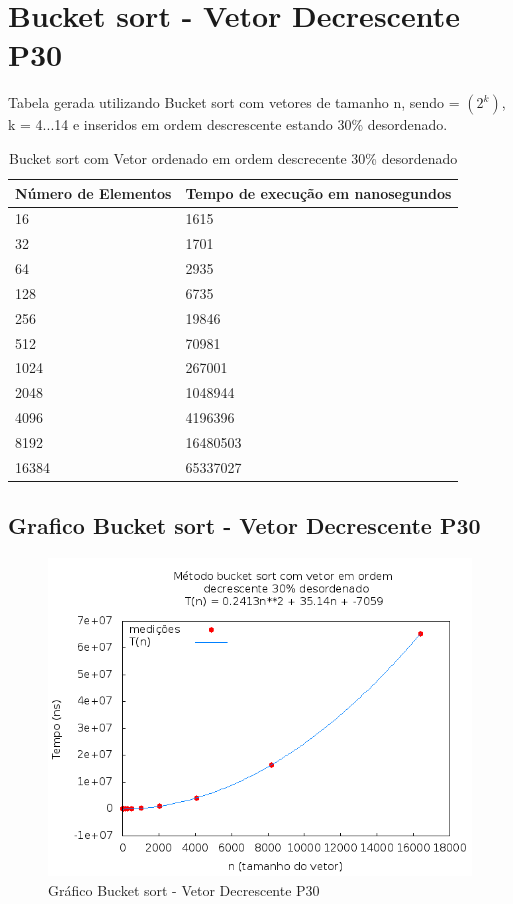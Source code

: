 \documentclass[12pt,a4paper,twoside]{report}
\begin{document}
\section{Bucket sort - Vetor Decrescente P30}
Tabela gerada utilizando Bucket sort com vetores de tamanho n, sendo = $(2^k)$, k = 4...14 e inseridos em ordem descrescente estando 30\% desordenado.

\begin{table}[H]
\centering
\caption{Bucket sort com Vetor ordenado em ordem descrecente 30\% desordenado}
\label{my-label}
\begin{tabular}{|l|l|}
\hline
\multicolumn{1}{|c|}{\textbf{Número de Elementos}} & \multicolumn{1}{c|}{\textbf{Tempo de execução em nanosegundos}} \\ \hline
16 & 1615 \\ \hline
32 & 1701 \\ \hline
64 & 2935 \\ \hline
128 & 6735 \\ \hline
256 & 19846 \\ \hline
512 & 70981 \\ \hline
1024 & 267001 \\ \hline
2048 & 1048944 \\ \hline
4096 & 4196396 \\ \hline
8192 & 16480503 \\ \hline
16384 & 65337027 \\ \hline
\end{tabular}
\end{table}

\subsection{Grafico Bucket sort - Vetor Decrescente P30}
\begin{figure}[H]
    \centering
    \includegraphics[width=0.7\linewidth]{graficos/Bucket/vIntDecrescenteP30/vIntDecrescenteP30.png}
  \caption{Gráfico Bucket sort - Vetor Decrescente P30}
\end{figure}
\end{document}
